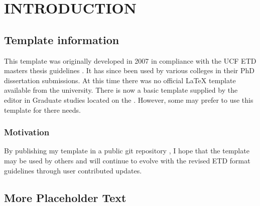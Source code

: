 %
%
%
%
%

\chapter{INTRODUCTION}

\lipsum[2] %


\section{Template information}
This template was originally developed in 2007 in compliance with the UCF ETD masters thesis guidelines \cite{ETD_Format}. It has since been used by various colleges in their PhD dissertation submissions. At this time there was no official LaTeX template available from the university. There is now a basic template supplied by the editor in Graduate studies located on the  \cite{ETD_Format}. However, some may prefer to use this template for there needs.

\subsection{Motivation}
By publishing my template in a public git repository \cite{TemplateGit}, I hope that the template may be used by others and will continue to evolve with the revised ETD format guidelines through user contributed updates.

\section{More Placeholder Text}
\lipsum[3-4] %
